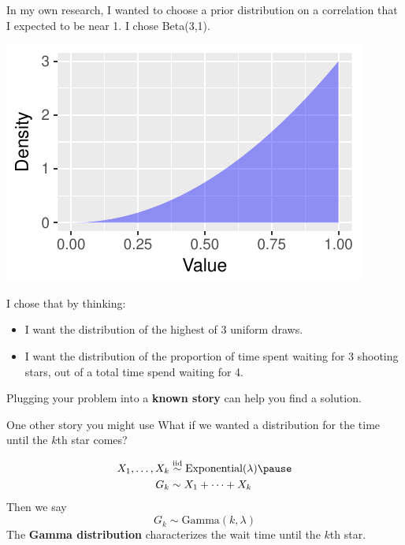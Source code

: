 \documentclass{beamer}
\newcommand\blue[1]{{\color{blue}#1}}
\newcommand\bblue[1]{{\color{blue}\textbf{#1}}}
\begin{document}
\begin{frame}
In my own research, I wanted to choose a prior distribution on a correlation that I expected to be near 1. I chose \blue{Beta(3,1)}.
\begin{center}
\includegraphics[width = .5\textwidth]{figs/beta_3_1.pdf}
\end{center}
I chose that by thinking:
\begin{itemize}
\item I want the distribution of the highest of 3 uniform draws.
\item I want the distribution of the proportion of time spent waiting for 3 shooting stars, out of a total time spend waiting for 4.
\end{itemize}
\begin{large}Plugging your problem into a \bblue{known story} can help you find a solution.\end{large}
\end{frame}


\begin{frame}{One other story you might use}
What if we wanted a distribution for the time until the $k$th star comes?

$$\begin{aligned}
X_1,\dots,X_k &\stackrel{\text{iid}}{\sim} \text{Exponential}(\lambda) \pause \\
G_k &\sim X_1 + \dots + X_k
\end{aligned}$$ \pause
Then we say
$$G_k\sim \text{Gamma}(k,\lambda)$$
The \bblue{Gamma distribution} characterizes the wait time until the $k$th star.
\end{frame}
\end{document}
